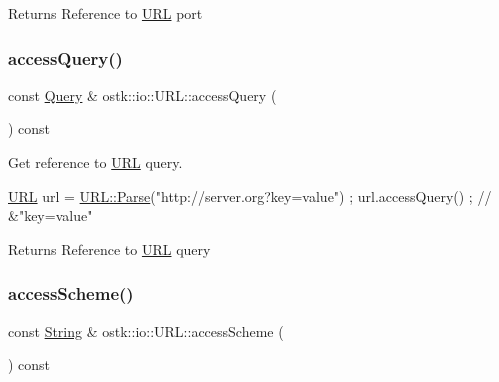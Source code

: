 \begin{DoxyReturn}{Returns}
Reference to \hyperlink{classostk_1_1io_1_1_u_r_l}{U\+RL} port 
\end{DoxyReturn}
\mbox{\label{classostk_1_1io_1_1_u_r_l_ad10cb94dcbe3952e59d508ccc36323c0}} 
\subsubsection{\texorpdfstring{access\+Query()}{accessQuery()}}
{\footnotesize\ttfamily const \hyperlink{namespaceostk_1_1io_aeabc644ba5c25896df8014bd0271f970}{Query} \& ostk\+::io\+::\+U\+R\+L\+::access\+Query (\begin{DoxyParamCaption}{ }\end{DoxyParamCaption}) const}



Get reference to \hyperlink{classostk_1_1io_1_1_u_r_l}{U\+RL} query. 


\begin{DoxyCode}
\hyperlink{classostk_1_1io_1_1_u_r_l_a2537e046cef4ac966cc295abb81279c2}{URL} url = \hyperlink{classostk_1_1io_1_1_u_r_l_a1cd7216bb1079f62386a218ba510958d}{URL::Parse}(\textcolor{stringliteral}{"http://server.org?key=value"}) ;
url.accessQuery() ; \textcolor{comment}{// &"key=value"}
\end{DoxyCode}


\begin{DoxyReturn}{Returns}
Reference to \hyperlink{classostk_1_1io_1_1_u_r_l}{U\+RL} query 
\end{DoxyReturn}
\mbox{\label{classostk_1_1io_1_1_u_r_l_ac807a165cb3da86a7b9cea5800754fa1}} 
\subsubsection{\texorpdfstring{access\+Scheme()}{accessScheme()}}
{\footnotesize\ttfamily const \hyperlink{namespaceostk_1_1io_a95d49b120613a7610cb1b4f03b1116b6}{String} \& ostk\+::io\+::\+U\+R\+L\+::access\+Scheme (\begin{DoxyParamCaption}{ }\end{DoxyParamCaption}) const}



